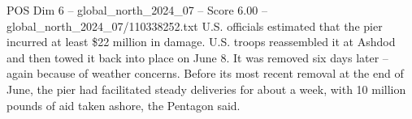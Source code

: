 \begin{textsample}{POS Dim 6 – global\_north\_2024\_07 – Score 6.00 – global\_north\_2024\_07/110338252.txt}
U.S. officials estimated that the pier incurred at least \$22 million in damage.
U.S. troops reassembled it at Ashdod and then towed it back into place on June 8.
It was removed six days later -- again because of weather concerns.
Before its most recent removal at the end of June, the pier had facilitated steady deliveries for about a week, with 10 million pounds of aid taken ashore, the Pentagon said.

\end{textsample}
